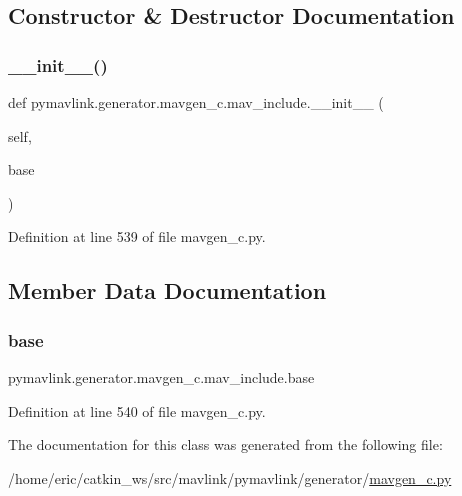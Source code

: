 \subsection{Constructor \& Destructor Documentation}
\mbox{\label{classpymavlink_1_1generator_1_1mavgen__c_1_1mav__include_a5cf023f53ba8bf561b4dfe7f7677dffd}} 
\subsubsection{\texorpdfstring{\_\_init\_\_()}{\_\_init\_\_()}}
{\footnotesize\ttfamily def pymavlink.\+generator.\+mavgen\+\_\+c.\+mav\+\_\+include.\+\_\+\+\_\+init\+\_\+\+\_\+ (\begin{DoxyParamCaption}\item[{}]{self,  }\item[{}]{base }\end{DoxyParamCaption})}



Definition at line 539 of file mavgen\+\_\+c.\+py.



\subsection{Member Data Documentation}
\mbox{\label{classpymavlink_1_1generator_1_1mavgen__c_1_1mav__include_a4b156838c0def042a0fbfa72b890f7cb}} 
\subsubsection{\texorpdfstring{base}{base}}
{\footnotesize\ttfamily pymavlink.\+generator.\+mavgen\+\_\+c.\+mav\+\_\+include.\+base}



Definition at line 540 of file mavgen\+\_\+c.\+py.



The documentation for this class was generated from the following file\+:\begin{DoxyCompactItemize}
\item 
/home/eric/catkin\+\_\+ws/src/mavlink/pymavlink/generator/\mbox{\hyperlink{mavgen__c_8py}{mavgen\+\_\+c.\+py}}\end{DoxyCompactItemize}
